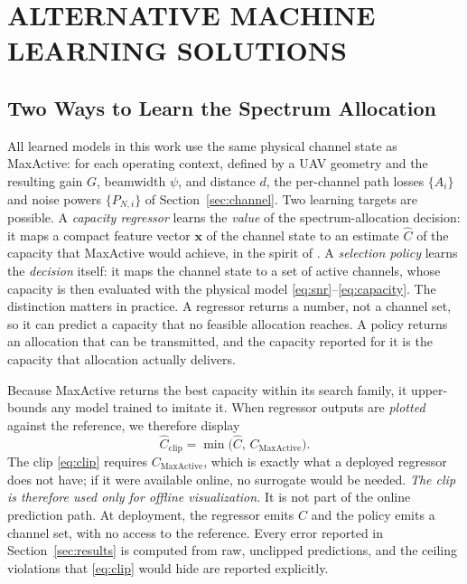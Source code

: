 \documentclass[correspondence]{IEEEtaes}
\begin{document}
\section{ALTERNATIVE MACHINE LEARNING SOLUTIONS}
\label{sec:ml}
\subsection{Two Ways to Learn the Spectrum Allocation}
\label{sec:ml-overview}
All learned models in this work use the same physical channel state as MaxActive: for
each operating context, defined by a UAV geometry and the resulting gain $G$, beamwidth
$\psi$, and distance $d$, the per-channel path losses $\{A_i\}$ and noise powers
$\{P_{N,i}\}$ of Section~\ref{sec:channel}. Two learning targets are possible. A
\emph{capacity regressor} learns the \emph{value} of the spectrum-allocation decision: it
maps a compact feature vector $\mathbf{x}$ of the channel state to an estimate $\hat C$ of
the capacity that MaxActive would achieve, in the spirit of
\cite{sun2018learning}. A \emph{selection policy} learns the \emph{decision} itself: it maps
the channel state to a set of active channels, whose capacity is then evaluated with the
physical model \eqref{eq:snr}--\eqref{eq:capacity}. The distinction matters in practice. A
regressor returns a number, not a channel set, so it can predict a capacity that no
feasible allocation reaches. A policy returns an allocation that can be transmitted,
and the capacity reported for it is the capacity that allocation actually delivers.

Because MaxActive returns the best capacity within its search family, it upper-bounds any
model trained to imitate it. When regressor outputs are \emph{plotted} against the
reference, we therefore display
\begin{equation}
\hat{C}_{\text{clip}}=\min\!\big(\hat{C},\,C_{\text{MaxActive}}\big).
\label{eq:clip}
\end{equation}
The clip \eqref{eq:clip} requires $C_{\text{MaxActive}}$, which is exactly what a
deployed regressor does not have; if it were available online, no surrogate would be
needed. \emph{The clip is therefore used only for offline visualization.} It is not part
of the online prediction path. At deployment, the regressor emits $\hat C$ and the
policy emits a channel set, with no access to the reference. Every error reported in
Section~\ref{sec:results} is computed from raw, unclipped predictions, and the
ceiling violations that \eqref{eq:clip} would hide are reported explicitly.
\end{document}
